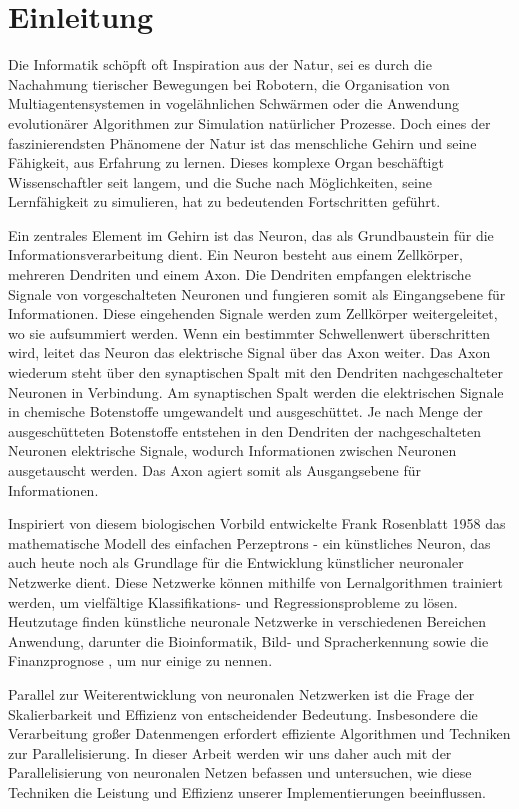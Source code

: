 \chapter{Einleitung}
\label{ch:Einleitung}

Die Informatik schöpft oft Inspiration aus der Natur, sei es durch die Nachahmung tierischer Bewegungen bei Robotern, die Organisation von Multiagentensystemen in vogelähnlichen Schwärmen oder die Anwendung evolutionärer Algorithmen zur Simulation natürlicher Prozesse. Doch eines der faszinierendsten Phänomene der Natur ist das menschliche Gehirn und seine Fähigkeit, aus Erfahrung zu lernen. Dieses komplexe Organ beschäftigt Wissenschaftler seit langem, und die Suche nach Möglichkeiten, seine Lernfähigkeit zu simulieren, hat zu bedeutenden Fortschritten geführt.

Ein zentrales Element im Gehirn ist das Neuron, das als Grundbaustein für die Informationsverarbeitung dient. Ein Neuron besteht aus einem Zellkörper, mehreren Dendriten und einem Axon. Die Dendriten empfangen elektrische Signale von vorgeschalteten Neuronen und fungieren somit als Eingangsebene für Informationen. Diese eingehenden Signale werden zum Zellkörper weitergeleitet, wo sie aufsummiert werden. Wenn ein bestimmter Schwellenwert überschritten wird, leitet das Neuron das elektrische Signal über das Axon weiter. Das Axon wiederum steht über den synaptischen Spalt mit den Dendriten nachgeschalteter Neuronen in Verbindung. Am synaptischen Spalt werden die elektrischen Signale in chemische Botenstoffe umgewandelt und ausgeschüttet. Je nach Menge der ausgeschütteten Botenstoffe entstehen in den Dendriten der nachgeschalteten Neuronen elektrische Signale, wodurch Informationen zwischen Neuronen ausgetauscht werden. Das Axon agiert somit als Ausgangsebene für Informationen.

Inspiriert von diesem biologischen Vorbild entwickelte Frank Rosenblatt 1958 das mathematische Modell des einfachen Perzeptrons - ein künstliches Neuron, das auch heute noch als Grundlage für die Entwicklung künstlicher neuronaler Netzwerke dient. Diese Netzwerke können mithilfe von Lernalgorithmen trainiert werden, um vielfältige Klassifikations- und Regressionsprobleme zu lösen. Heutzutage finden künstliche neuronale Netzwerke in verschiedenen Bereichen Anwendung, darunter die Bioinformatik, Bild- und Spracherkennung sowie die Finanzprognose , um nur einige zu nennen.

Parallel zur Weiterentwicklung von neuronalen Netzwerken ist die Frage der Skalierbarkeit und Effizienz von entscheidender Bedeutung. Insbesondere die Verarbeitung großer Datenmengen erfordert effiziente Algorithmen und Techniken zur Parallelisierung. In dieser Arbeit werden wir uns daher auch mit der Parallelisierung von neuronalen Netzen befassen und untersuchen, wie diese Techniken die Leistung und Effizienz unserer Implementierungen beeinflussen.

